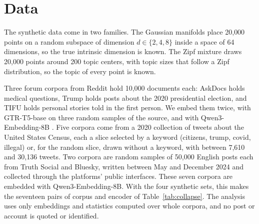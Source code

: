\section{Data}
\label{sec:data}

The synthetic data come in two families. The Gaussian manifolds place 20{,}000 points on a random subspace of dimension $d \in \{2, 4, 8\}$ inside a space of 64 dimensions, so the true intrinsic dimension is known. The Zipf mixture draws 20{,}000 points around 200 topic centers, with topic sizes that follow a Zipf distribution, so the topic of every point is known.

Three forum corpora from Reddit hold 10{,}000 documents each: AskDocs holds medical questions, Trump holds posts about the 2020 presidential election, and TIFU holds personal stories told in the first person. We embed them twice, with GTR-T5-base \citep{ni2022gtr} on three random samples of the source, and with Qwen3-Embedding-8B \citep{qwen3embedding2025}. Five corpora come from a 2020 collection of tweets about the United States Census, each a slice selected by a keyword (citizens, trump, covid, illegal) or, for the random slice, drawn without a keyword, with between 7{,}610 and 30{,}136 tweets. Two corpora are random samples of 50{,}000 English posts each from Truth Social and Bluesky, written between May and December 2024 and collected through the platforms' public interfaces. These seven corpora are embedded with Qwen3-Embedding-8B. With the four synthetic sets, this makes the seventeen pairs of corpus and encoder of Table~\ref{tab:collapse}. The analysis uses only embeddings and statistics computed over whole corpora, and no post or account is quoted or identified.
